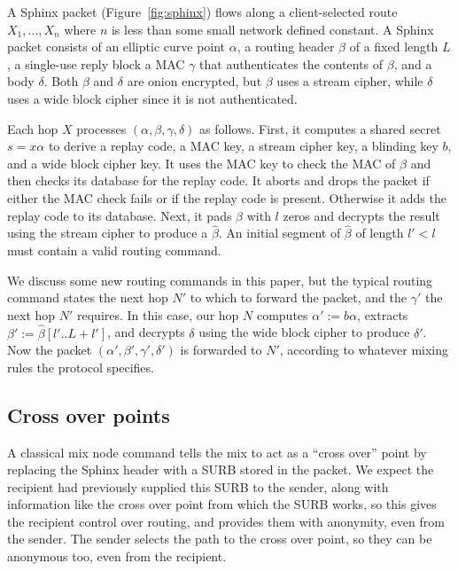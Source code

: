 A Sphinx packet (Figure~\ref{fig:sphinx}) flows along a client-selected
route $X_1,\ldots,X_n$ where $n$ is less than some small network defined
constant.  A Sphinx packet consists of an elliptic curve point $\alpha$,
a routing header $\beta$ of a fixed length $L$, a single-use reply block
a MAC $\gamma$ that authenticates the contents of $\beta$, and a body
$\delta$.  Both $\beta$ and $\delta$ are onion encrypted, but $\beta$
uses a stream cipher, while $\delta$ uses a wide block cipher since
it is not authenticated.

Each hop $X$ processes $(\alpha,\beta,\gamma,\delta)$ as follows.  
First, it computes a shared secret $s = x \alpha$ to
derive a replay code, a MAC key, a stream cipher key, 
 a blinding key $b$, and a wide block cipher key. 
It uses the MAC key to check the MAC of $\beta$ and
 then checks its database for the replay code.
It aborts and drops the packet if either the MAC check fails or
 if the replay code is present.  Otherwise it adds the replay code
 to its database.
Next, it pads $\beta$ with $l$ zeros and decrypts the result
 using the stream cipher to produce a $\hat\beta$.
An initial segment of $\hat\beta$ of length $l' < l$ must contain
a valid routing command.  

We discuss some new routing commands in this paper, but the typical
routing command states the next hop $N'$ to which to forward the
packet, and the $\gamma'$ the next hop $N'$ requires. 
In this case, our hop $N$ computes $\alpha' := b \alpha$,
extracts $\beta' := \hat\beta[l'..L+l']$, and
decrypts $\delta$ using the wide block cipher to produce $\delta'$.
Now the packet $(\alpha',\beta',\gamma',\delta')$ is forwarded to $N'$,
 according to whatever mixing rules the protocol specifies.


\subsection{Cross over points}\label{subsec:crossover}


A classical mix node command tells the mix to act as a ``cross over''
point by replacing the Sphinx header with a SURB stored in the packet.
We expect the recipient had previously supplied this SURB to the
sender, along with information like the cross over point from which
the SURB works, so this gives the recipient control over routing, 
and provides them with anonymity, even from the sender.  
The sender selects the path to the cross over point, so they can be
anonymous too, even from the recipient.

